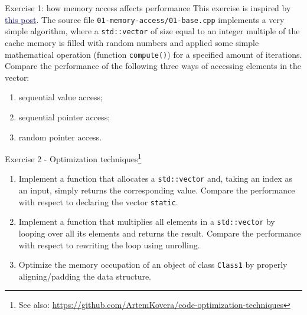 \documentclass[10pt]{beamer}
\begin{document}
\begin{frame}{Exercise 1: how memory access affects performance}
    This exercise is inspired by \href{https://bitbashing.io/memory-performance.html}{\textcolor{DarkBlue}{this post}}.
    \vfill
    The source file \texttt{01-memory-access/01-base.cpp} implements a very simple algorithm, where a \texttt{std::vector} of size equal to an integer multiple of the cache memory is filled with random numbers and applied some simple mathematical operation (function \texttt{compute()}) for a specified amount of iterations.
    \vfill
    Compare the performance of the following three ways of accessing elements in the vector:
    \begin{enumerate}
        \item sequential value access;
        \item sequential pointer access;
        \item random pointer access.
    \end{enumerate}
\end{frame}

\begin{frame}{Exercise 2 - Optimization techniques\footnote{See also: \url{https://github.com/ArtemKovera/code-optimization-techniques}}}
    \begin{enumerate}
        \item Implement a function that allocates a \texttt{std::vector} and, taking an index as an input, simply returns the corresponding value. Compare the performance with respect to declaring the vector \texttt{static}.
        \item Implement a function that multiplies all elements in a \texttt{std::vector} by looping over all its elements and returns the result. Compare the performance with respect to rewriting the loop using unrolling.
        \item Optimize the memory occupation of an object of class \texttt{Class1} by properly aligning/padding the data structure.
    \end{enumerate}
\end{frame}
\end{document}
